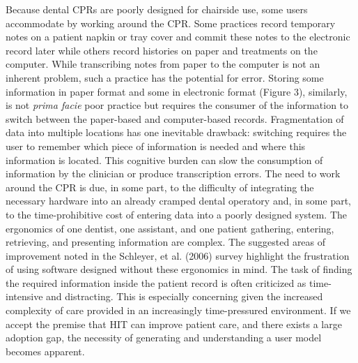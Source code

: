 \documentclass[11pt]{article}
\begin{document}
Because dental CPRs are poorly designed for chairside use, some users accommodate by working around the CPR. Some practices record temporary notes on a patient napkin or tray cover and commit these notes to the electronic record later while others record histories on paper and treatments on the computer. While transcribing notes from paper to the computer is not an inherent problem, such a practice has the potential for error. Storing some information in paper format and some in electronic format (Figure 3), similarly, is not \emph{prima facie} poor practice but requires the consumer of the information to switch between the paper-based and computer-based records. Fragmentation of data into multiple locations has one inevitable drawback: switching requires the user to remember which piece of information is needed and where this information is located. This cognitive burden can slow the consumption of information by the clinician or produce transcription errors\cite{Salvucci2009Toward-a-unifie}. The need to work around the CPR is due, in some part, to the difficulty of integrating the necessary hardware into an already cramped dental operatory\cite{Schleyer2004Why-integration,Unthank2004Designing-your-} and, in some part, to the time-prohibitive cost of entering data into a poorly designed system. The ergonomics of one dentist, one assistant, and one patient gathering, entering, retrieving, and presenting information are complex. The suggested areas of improvement noted in the Schleyer, et al. (2006) survey highlight the frustration of using software designed without these ergonomics in mind. The task of finding the required information inside the patient record is often criticized as time-intensive and distracting\cite{Nygren1998Helping-clinici}. This is especially concerning given the increased complexity of care provided in an increasingly time-pressured environment. If we accept the premise that HIT can improve patient care, and there exists a large adoption gap, the necessity of generating and understanding a user model becomes apparent.
\end{document}
